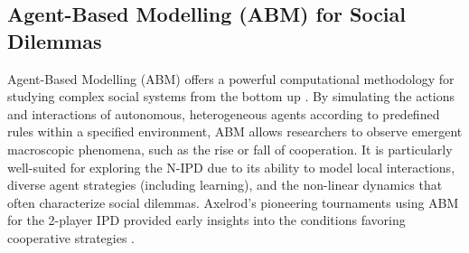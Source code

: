 \documentclass[]{llncs} %
\begin{document}
\subsection{Agent-Based Modelling (ABM) for Social Dilemmas}
Agent-Based Modelling (ABM) offers a powerful computational methodology for studying complex social systems from the bottom up \cite{Gilbert2007, Macal2010}. %
By simulating the actions and interactions of autonomous, heterogeneous agents according to predefined rules within a specified environment, ABM allows researchers to observe emergent macroscopic phenomena, such as the rise or fall of cooperation. It is particularly well-suited for exploring the N-IPD due to its ability to model local interactions, diverse agent strategies (including learning), and the non-linear dynamics that often characterize social dilemmas. Axelrod's pioneering tournaments using ABM for the 2-player IPD provided early insights into the conditions favoring cooperative strategies \cite{Axelrod}.
\end{document}
